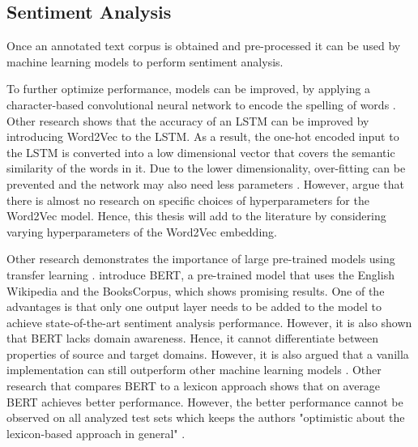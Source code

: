 \documentclass[11pt, a4paper]{article}
\begin{document}
\subsection{Sentiment Analysis}
Once an annotated text corpus is obtained and pre-processed it can be used by machine learning models to perform sentiment analysis.

To further optimize performance, models can be improved, by applying a character-based 
convolutional neural network to encode the spelling of words \citep{pei2019slang}. Other research shows that the accuracy of an
LSTM can be improved by introducing Word2Vec to the LSTM. As a result, the one-hot encoded input to the LSTM is
converted into a low dimensional vector that covers the semantic similarity of the words in it. Due to the lower dimensionality,
over-fitting can be prevented and the network may also need less parameters \citep{xiao2018word2veclstm}. However, \cite{giovanni2021word2vec}
argue that there is almost no research on specific choices of hyperparameters for the Word2Vec model. Hence, this thesis will add to the literature
by considering varying hyperparameters of the Word2Vec embedding.

Other research demonstrates the importance of large pre-trained models using transfer learning \citep{deng2009transferlearning}.
\cite{devlin2019bert} introduce BERT, a pre-trained model that uses the English Wikipedia and the BooksCorpus, which shows promising results.
One of the advantages is that only one output layer needs to be added to the model to achieve state-of-the-art sentiment analysis performance.
However, it is also shown that BERT lacks domain awareness. Hence, it cannot differentiate between properties of source and target domains. However,
it is also argued that a vanilla implementation can still outperform other machine learning models \citep{Du2020AdversarialAD}. Other research that compares BERT to a
lexicon approach shows that on average BERT achieves better performance. However, the better performance cannot be observed on all analyzed test sets
which keeps the authors "optimistic about the lexicon-based approach in general" \citep{kotelnikova2021lexiconbased}. %
\end{document}
